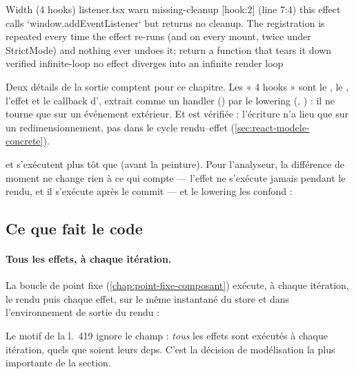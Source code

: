 \begin{sortie}
  Width  (4 hooks)  listener.tsx
    warn   missing-cleanup  [hook:2]  (line 7:4)  this effect calls `window.addEventListener` but returns no cleanup. The registration is repeated every time the effect re-runs (and on every mount, twice under StrictMode) and nothing ever undoes it; return a function that tears it down
    verified  infinite-loop  no effect diverges into an infinite render loop
\end{sortie}

Deux détails de la sortie comptent pour ce chapitre. Les « 4 hooks » sont le
, le , l'effet et le callback d',
extrait comme un handler () par le lowering
(, ) : il ne tourne que sur un
événement extérieur. Et  est vérifiée : l'écriture
 n'a lieu que sur un redimensionnement, pas dans le cycle
rendu--effet (\cref{sec:react-modele-concrete}).

 et  s'exécutent plus tôt que
 (avant la peinture). Pour l'analyseur, la différence de moment
ne change rien à ce qui compte --- l'effet ne s'exécute jamais pendant le rendu,
et il s'exécute après le commit --- et le lowering les confond :


\subsection{Ce que fait le code}

\paragraph{Tous les effets, à chaque itération.} La boucle de point fixe
(\cref{chap:point-fixe-composant}) exécute, à chaque itération, le rendu puis
chaque effet, sur le même instantané du store et dans l'environnement de sortie
du rendu :


Le motif  de la l.~419
ignore le champ  : \emph{tous} les effets sont exécutés à chaque
itération, quels que soient leurs deps. C'est la décision de modélisation la
plus importante de la section.

